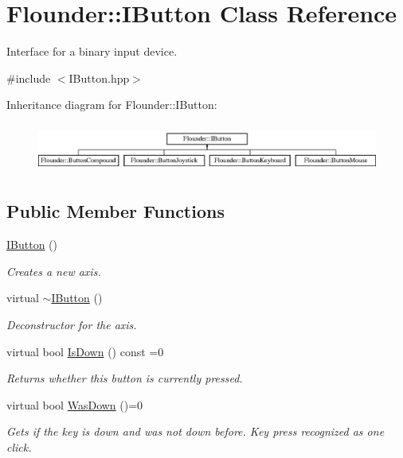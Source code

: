 \hypertarget{class_flounder_1_1_i_button}{}\section{Flounder\+:\+:I\+Button Class Reference}
\label{class_flounder_1_1_i_button}


Interface for a binary input device.  




{\ttfamily \#include $<$I\+Button.\+hpp$>$}

Inheritance diagram for Flounder\+:\+:I\+Button\+:\begin{figure}[H]
\begin{center}
\leavevmode
\includegraphics[height=1.627907cm]{class_flounder_1_1_i_button}
\end{center}
\end{figure}
\subsection*{Public Member Functions}
\begin{DoxyCompactItemize}
\item 
\hyperlink{class_flounder_1_1_i_button_af49e102329aa1a4455f2d928009a96c5}{I\+Button} ()
\begin{DoxyCompactList}\small\item\em Creates a new axis. \end{DoxyCompactList}\item 
virtual \hyperlink{class_flounder_1_1_i_button_a3e3bf3c4ddb53762269bf524d50390b6}{$\sim$\+I\+Button} ()
\begin{DoxyCompactList}\small\item\em Deconstructor for the axis. \end{DoxyCompactList}\item 
virtual bool \hyperlink{class_flounder_1_1_i_button_a264519250d835422748bcc1af9be38e3}{Is\+Down} () const =0
\begin{DoxyCompactList}\small\item\em Returns whether this button is currently pressed. \end{DoxyCompactList}\item 
virtual bool \hyperlink{class_flounder_1_1_i_button_af31c7669349991fe6a57beb8bd42c5b2}{Was\+Down} ()=0
\begin{DoxyCompactList}\small\item\em Gets if the key is down and was not down before. Key press recognized as one click. \end{DoxyCompactList}\end{DoxyCompactItemize}


